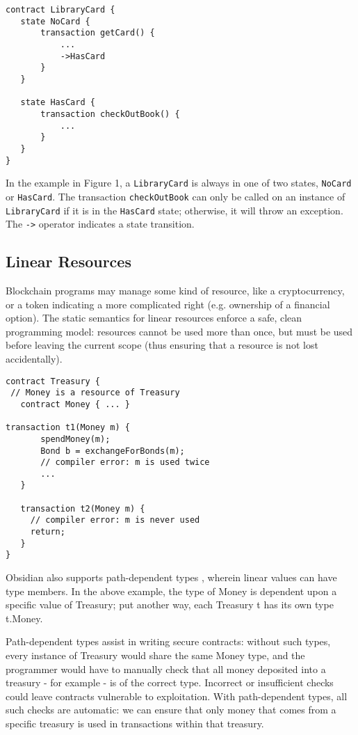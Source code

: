\documentclass[sigplan,10pt,review]{acmart}\settopmatter{printfolios=true}
\begin{document}
\begin{lstlisting}[caption={An example of states in Obsidian.},captionpos=b]
contract LibraryCard {
   state NoCard {
       transaction getCard() {
           ...
           ->HasCard
       }
   }
  
   state HasCard {
       transaction checkOutBook() {
           ...
       }
   }
}
\end{lstlisting}

In the example in Figure 1,  a \texttt{\small{LibraryCard}} is always in one of two
states, \texttt{\small{NoCard}} or \texttt{\small{HasCard}}. The transaction 
\texttt{\small{checkOutBook}} can only be called on an instance of 
\texttt{\small{LibraryCard}} if it is in the \texttt{\small{HasCard}} state; otherwise, it will throw an exception. 
The \texttt{\small{->}} operator indicates a state transition.

\subsection{Linear Resources}

Blockchain programs may manage some kind of resource, like a cryptocurrency, or a token 
indicating a more complicated right (e.g. ownership of a financial option). The static semantics for linear resources \cite{Wadler} 
enforce a safe, clean programming model: resources cannot be used more than once, but must be 
used before leaving the current scope (thus ensuring that a resource is not lost accidentally). 

\begin{lstlisting}[caption={Linear resources in Obsidian},captionpos=b]
contract Treasury {
 // Money is a resource of Treasury
   contract Money { ... }

transaction t1(Money m) {
       spendMoney(m);
       Bond b = exchangeForBonds(m);
       // compiler error: m is used twice
       ...
   }

   transaction t2(Money m) {
     // compiler error: m is never used
     return;
   }
}
\end{lstlisting}

Obsidian also supports path-dependent types \cite{Amin}, wherein linear values can have type members. In the 
above example, the type of Money is dependent upon a specific value of Treasury; put another way, 
each Treasury t has its own type t.Money. 

Path-dependent types assist in writing secure contracts: without such types, every instance of 
Treasury would share the same Money type, and the programmer would have to manually check 
that all money deposited into a treasury - for example - is of the correct type. Incorrect or insufficient 
checks could leave contracts vulnerable to exploitation. With path-dependent types, all such checks 
are automatic: we can ensure that only money that comes from a specific treasury is used in 
transactions within that treasury. 
\end{document}
